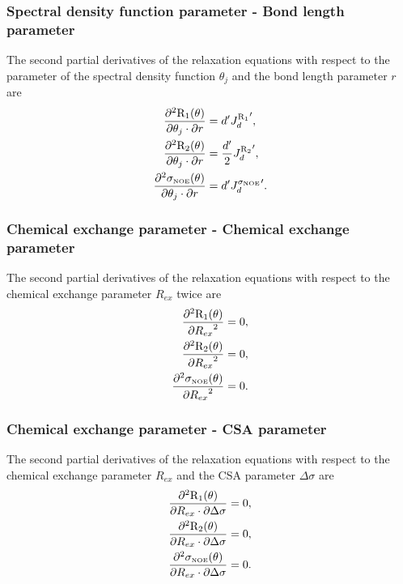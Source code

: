 \subsubsection{Spectral density function parameter - Bond length parameter}

The second partial derivatives of the relaxation equations with respect to the parameter of the spectral density function $\theta_j$ and the bond length parameter $r$ are
\begin{align}
    \frac{\partial^2 \mathrm{R}_1(\theta)}{\partial \theta_j \cdot \partial r} &= d' {J_d^{\mathrm{R}_1}}',               \label{eq: Ri': d2R1/dmfj.dr} \\
    \frac{\partial^2 \mathrm{R}_2(\theta)}{\partial \theta_j \cdot \partial r} &= \frac{d'}{2} {J_d^{\mathrm{R}_2}}',     \label{eq: Ri': d2R2/dmfj.dr} \\
    \frac{\partial^2 \sigma_{\scriptscriptstyle \mathrm{NOE}}(\theta)}{\partial \theta_j \cdot \partial r} &= d' {J_d^{\sigma_{\scriptscriptstyle \mathrm{NOE}}}}'. \label{eq: Ri': d2sigmaNOE/dmfj.dr}
\end{align}


\subsubsection{Chemical exchange parameter - Chemical exchange parameter}

The second partial derivatives of the relaxation equations with respect to the chemical exchange parameter $R_{ex}$ twice are
\begin{align}
    \frac{\partial^2 \mathrm{R}_1(\theta)}{{\partial R_{ex}}^2} &= 0,        \label{eq: Ri': d2R1/dRex2} \\
    \frac{\partial^2 \mathrm{R}_2(\theta)}{{\partial R_{ex}}^2} &= 0,        \label{eq: Ri': d2R2/dRex2} \\
    \frac{\partial^2 \sigma_{\scriptscriptstyle \mathrm{NOE}}(\theta)}{{\partial R_{ex}}^2} &= 0. \label{eq: Ri': d2sigmaNOE/dRex2}
\end{align}


\subsubsection{Chemical exchange parameter - CSA parameter}

The second partial derivatives of the relaxation equations with respect to the chemical exchange parameter $R_{ex}$ and the CSA parameter $\Delta\sigma$ are
\begin{align}
    \frac{\partial^2 \mathrm{R}_1(\theta)}{\partial R_{ex} \cdot \partial \Delta\sigma} &= 0,        \label{eq: Ri': d2R1/dRex.dCSA} \\
    \frac{\partial^2 \mathrm{R}_2(\theta)}{\partial R_{ex} \cdot \partial \Delta\sigma} &= 0,        \label{eq: Ri': d2R2/dRex.dCSA} \\
    \frac{\partial^2 \sigma_{\scriptscriptstyle \mathrm{NOE}}(\theta)}{\partial R_{ex} \cdot \partial \Delta\sigma} &= 0. \label{eq: Ri': d2sigmaNOE/dRex.dCSA}
\end{align}


